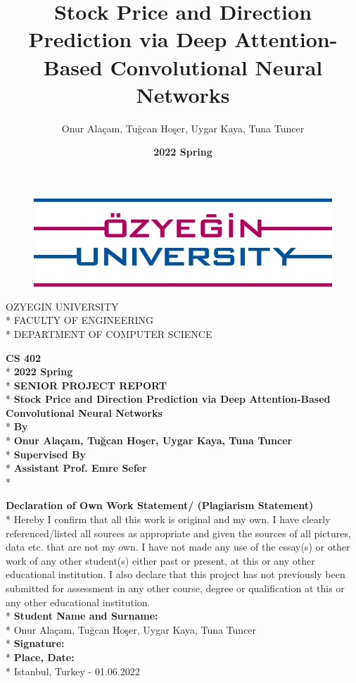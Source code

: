 \documentclass[]{article}
\title{\textbf{Stock Price and Direction Prediction via Deep Attention-Based Convolutional Neural Networks}}
\author{Onur Alaçam, Tuğcan Hoşer, Uygar Kaya, Tuna Tuncer}
\date{\textbf{2022 Spring}}
\begin{document}
\begin{figure}[h]
    \begin{center}
        \includegraphics[]{assets/OzU.png}
    \end{center}
\end{figure}

\begin{center}
    OZYEGIN UNIVERSITY\\*
    FACULTY OF ENGINEERING\\*
    DEPARTMENT OF COMPUTER SCIENCE
\end{center}

\begin{center}
    \textbf{CS 402}\\* \vspace{0.2cm}
    \textbf{2022 Spring}\\* \vspace{0.4cm}
    \textbf{SENIOR PROJECT REPORT}\\* \vspace{0.6cm}
    \textbf{Stock Price and Direction Prediction via Deep Attention-Based Convolutional Neural Networks}\\* \vspace{0.8cm}
    \textbf{By}\\*
    \textbf{Onur Alaçam, Tuğcan Hoşer, Uygar Kaya, Tuna Tuncer}\\* \vspace{0.6cm}
    \textbf{Supervised By}\\*
    \textbf{Assistant Prof. Emre Sefer}\\* \vspace{0.6cm}
\end{center}
\textbf{Declaration of Own Work Statement/ (Plagiarism Statement)}\\*
Hereby I confirm that all this work is original and my own. I have clearly referenced/listed all sources as appropriate and given the sources of all pictures, data etc. that are not my own. I have not made any use of the essay(s) or other work of any other student(s) either past or present, at this or any other educational institution. I also declare that this project has not previously been submitted for assessment in any other course, degree or qualification at this or any other educational institution.\vspace{0.2cm}\\*
\textbf{Student Name and Surname:}\\* Onur Alaçam, Tuğcan Hoşer, Uygar Kaya, Tuna Tuncer \vspace{0.1cm}\\*
\textbf{Signature:} \vspace{0.9cm}\\*
\textbf{Place, Date:}\\* Istanbul, Turkey - 01.06.2022
\end{document}
